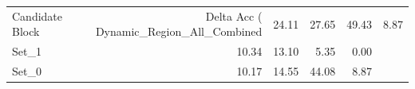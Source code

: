 \begin{tabular}{lrrrr}
\toprule
Candidate Block & Delta Acc (%
\midrule
Dynamic_Region_All_Combined & 24.11 & 27.65 & 49.43 & 8.87 \\
Set_1 & 10.34 & 13.10 & 5.35 & 0.00 \\
Set_0 & 10.17 & 14.55 & 44.08 & 8.87 \\
\bottomrule
\end{tabular}
